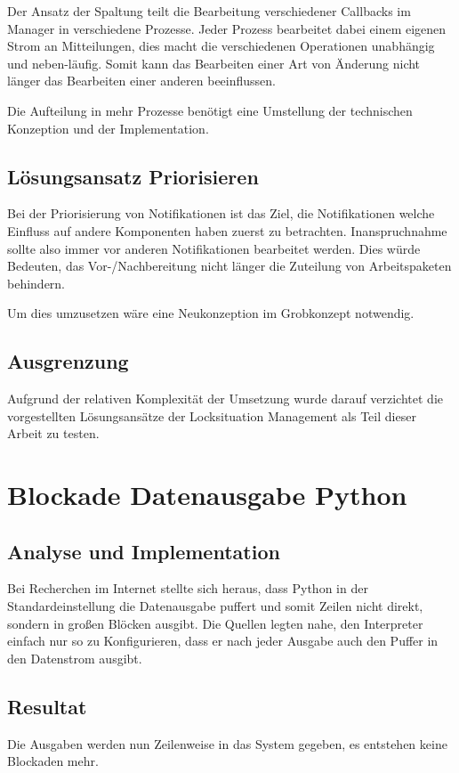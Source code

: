 Der Ansatz der Spaltung teilt die Bearbeitung verschiedener Callbacks im Manager
in verschiedene Prozesse. Jeder Prozess bearbeitet dabei einem eigenen Strom an Mitteilungen, dies macht die verschiedenen Operationen unabhängig und neben-läufig.
Somit kann das Bearbeiten einer Art von Änderung nicht länger das Bearbeiten einer anderen beeinflussen.

Die Aufteilung in mehr Prozesse benötigt eine Umstellung der technischen Konzeption und der Implementation.

\subsection{Lösungsansatz Priorisieren}

Bei der Priorisierung von Notifikationen ist das Ziel,
die Notifikationen welche Einfluss auf andere Komponenten haben zuerst zu betrachten.
Inanspruchnahme sollte also immer vor anderen Notifikationen bearbeitet werden.
Dies würde Bedeuten, das Vor-/Nachbereitung nicht länger die Zuteilung von Arbeitspaketen behindern.

Um dies umzusetzen wäre eine Neukonzeption im Grobkonzept notwendig.


\subsection{Ausgrenzung}

Aufgrund der relativen Komplexität der Umsetzung
wurde darauf verzichtet die vorgestellten Lösungsansätze der Locksituation Management
als Teil dieser Arbeit zu testen.

\section{Blockade Datenausgabe Python}
\subsection{Analyse und Implementation}

Bei Recherchen im Internet stellte sich heraus,
dass Python in der Standardeinstellung die Datenausgabe puffert und somit Zeilen nicht direkt,
sondern in großen Blöcken ausgibt.
Die Quellen legten nahe, den Interpreter einfach nur so zu Konfigurieren,
dass er nach jeder Ausgabe auch den Puffer in den Datenstrom ausgibt.

\subsection{Resultat}

Die Ausgaben werden nun Zeilenweise in das System gegeben,
es entstehen keine Blockaden mehr.
